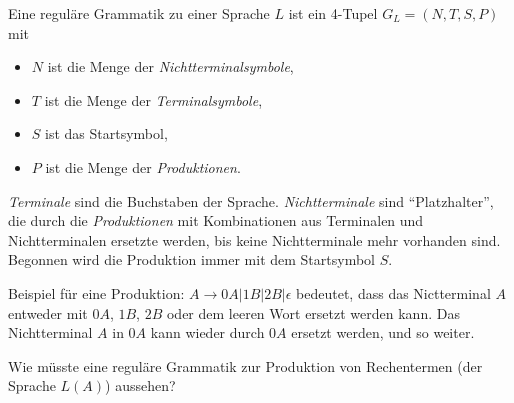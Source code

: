 \documentclass[10pt, a4paper]{scrartcl}
\begin{document}
\begin{infobox}
Eine reguläre Grammatik zu einer Sprache $L$ ist ein 4-Tupel $G_L = (N, T, S, P)$ mit
\begin{itemize}
	\item $N$ ist die Menge der \emph{Nichtterminalsymbole},
	\item $T$ ist die Menge der \emph{Terminalsymbole},
	\item $S$ ist das Startsymbol,
	\item $P$ ist die Menge der \emph{Produktionen}.
\end{itemize}
\end{infobox}

\emph{Terminale} sind die Buchstaben der Sprache. \emph{Nichtterminale} sind \enquote{Platzhalter}, die durch die \emph{Produktionen} mit Kombinationen aus Terminalen und Nichtterminalen ersetzte werden, bis keine Nichtterminale mehr vorhanden sind. Begonnen wird die Produktion immer mit dem Startsymbol $S$.

{\small Beispiel für eine Produktion: $A \rightarrow 0A | 1B | 2B | \epsilon$ bedeutet, dass das Nictterminal $A$ entweder mit $0A$, $1B$, $2B$ oder dem leeren Wort ersetzt werden kann. Das Nichtterminal $A$ in $0A$ kann wieder durch $0A$ ersetzt werden, und so weiter.}

\begin{aufgabe}
Wie müsste eine reguläre Grammatik zur Produktion von Rechentermen (der Sprache $L(A)$) aussehen?
\end{aufgabe}
\end{document}
